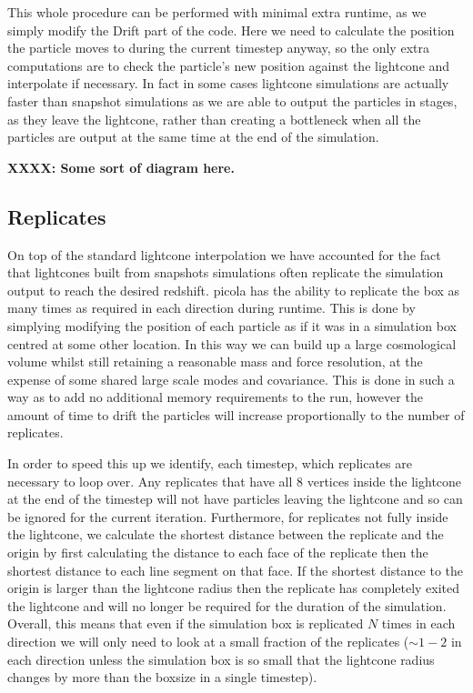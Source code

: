 \documentclass[5p,authoryear]{elsarticle}
\begin{document}
This whole procedure can be performed with minimal extra runtime, as we simply modify the Drift part of the code. Here we need to calculate the position the particle moves to during the current timestep anyway, so the only extra computations are to check the particle's new position against the lightcone and interpolate if necessary. In fact in some cases lightcone simulations are actually faster than snapshot simulations as we are able to output the particles in stages, as they leave the lightcone, rather than creating a bottleneck when all the particles are output at the same time at the end of the simulation.

\textbf{XXXX: Some sort of diagram here.}

\subsection{Replicates}

On top of the standard lightcone interpolation we have accounted for the fact that lightcones built from snapshots simulations often replicate the simulation output to reach the desired redshift. {\sc picola} has the ability to replicate the box as many times as required in each direction during runtime. This is done by simplying modifying the position of each particle as if it was in a simulation box centred at some other location. In this way we can build up a large cosmological volume whilst still retaining a reasonable mass and force resolution, at the expense of some shared large scale modes and covariance. This is done in such a way as to add no additional memory requirements to the run, however the amount of time to drift the particles will increase proportionally to the number of replicates. 

In order to speed this up we identify, each timestep, which replicates are necessary to loop over. Any replicates that have all 8 vertices inside the lightcone at the end of the timestep will not have particles leaving the lightcone and so can be ignored for the current iteration. Furthermore, for replicates not fully inside the lightcone, we calculate the shortest distance between the replicate and the origin by first calculating the distance to each face of the replicate then the shortest distance to each line segment on that face. If the shortest distance to the origin is larger than the lightcone radius then the replicate has completely exited the lightcone and will no longer be required for the duration of the simulation. Overall, this means that even if the simulation box is replicated $N$ times in each direction we will only need to look at a small fraction of the replicates ($\sim1-2$ in each direction unless the simulation box is so small that the lightcone radius changes by more than the boxsize in a single timestep).
\end{document}
